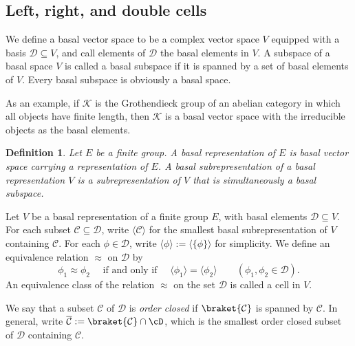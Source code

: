 \documentclass[12pt]{amsart}
\def\subset{\subseteq}
\newcommand{\CC}{{\mathcal {C}}}
\newcommand{\CK}{{\mathcal {K}}}
\newcommand{\la}{\langle}
\newcommand{\ra}{\rangle}
\numberwithin{equation}{section}
\newtheorem{defn}[thm]{Definition}
\theoremstyle{remark}
\begin{document}
\subsection{Left, right, and double cells}\label{seccell}

We define a basal vector space to be a complex vector space $V$ equipped with a basis $\mathcal D\subset V$, and call elements of $\mathcal D$ the basal elements in $V$. A subspace of a basal space $V$ is called a basal subspace if it is spanned by a set of basal elements of $V$. Every basal subspace is obviously a basal space.

As an example, if $\CK$ is the Grothendieck group of an abelian category in which all objects have finite length, then $\CK$ is a basal vector space with the irreducible objects as the basal elements.





\begin{defn}
Let $E$ be a  finite group. A basal representation of $E$ is basal vector space carrying a representation of $E$. A basal subrepresentation of a basal representation $V$ is a subrepresentation of $V$ that is simultaneously a basal subspace.
\end{defn}




Let $V$ be a basal representation of a finite group $E$, with basal elements
$\mathcal D\subset V$. For each subset $\mathcal C\subset \mathcal D$, write $\la \CC\ra$ for
the smallest basal subrepresentation of $V$ containing $\CC$. For each
$\phi\in \mathcal D$, write $\la \phi\ra:=\la \{\phi\}\ra$ for simplicity. We define an equivalence relation $\approx$ on $\mathcal D$  by
\[
  \phi_1 \approx \phi_2 \quad \textrm{ if and only if
  } \quad \la \phi_1 \ra =\la \phi_2 \ra \qquad (\phi_1, \phi_2\in \mathcal D).
\]
An equivalence class of the relation $\approx$ on the set $\mathcal D$ is called a cell in $V$.

We say that a subset $\CC$ of $\mathcal D$ is \emph{order closed} if
$\braket{\CC}$ is spanned by $\CC$. In general, write $\overline \CC:=\braket{\CC}\cap \cD$, which is  the smallest order closed subset of $\mathcal D$ containing $\CC$.
\end{document}
